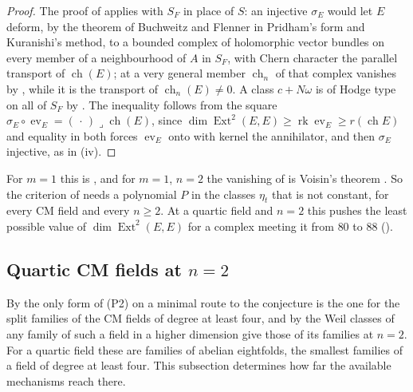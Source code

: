 \documentclass[11pt,reqno]{amsart}
\theoremstyle{plain}
\theoremstyle{definition}
\theoremstyle{remark}
\DeclareMathOperator{\ch}{ch}
\DeclareMathOperator{\Ext}{Ext}
\begin{document}
\begin{proof}
The proof of  applies with $S_{F}$ in place of $S$: an
injective $\sigma_{E}$ would let $E$ deform, by the theorem of Buchweitz and
Flenner in Pridham's form and Kuranishi's method, to a bounded complex of
holomorphic vector bundles on every member of a neighbourhood of $A$ in
$S_{F}$, with Chern character the parallel transport of $\ch(E)$; at a very
general member $\ch_{n}$ of that complex vanishes by
, while it is the transport of
$\ch_{n}(E)\ne0$. A class $c+N\omega$ is of Hodge type on all of $S_{F}$ by
. The inequality follows from the square
$\sigma_{E}\circ\operatorname{ev}_{E}=(\,\cdot\,)\lrcorner\ch(E)$, since
$\dim\Ext^{2}(E,E)\ge\operatorname{rk}\operatorname{ev}_{E}\ge r(\ch E)$ and
equality in both forces $\operatorname{ev}_{E}$ onto with kernel the
annihilator, and then $\sigma_{E}$ injective, as in
(iv).
\end{proof}

For $m=1$ this is , and for $m=1$, $n=2$ the vanishing of
 is Voisin's theorem \cite[Theorem~10]{Voi02b}.
So the criterion of \cite[Theorem~17.7(v)]{paperI} needs a polynomial $P$ in the
classes $\eta_{t}$ that is not constant, for every CM field and every
$n\ge2$. At a quartic field and $n=2$ this pushes the least possible value of
$\dim\Ext^{2}(E,E)$ for a complex meeting it from $80$ to $88$
().
\subsection{Quartic CM fields at \texorpdfstring{$n=2$}{n=2}}
\label{ssec:quartic}

By \cite[Theorem~2.70(ii)]{paperIII} the only form of (P2) on a minimal route to the
conjecture is the one for the split families of the CM fields of degree at
least four, and by \cite[Proposition~2.13(i)]{paperIII} the Weil classes of any family of
such a field in a higher dimension give those of its families at $n=2$. For a
quartic field these are families of abelian eightfolds, the smallest
families of a field of degree at least four. This subsection determines how
far the available mechanisms reach there.
\end{document}
